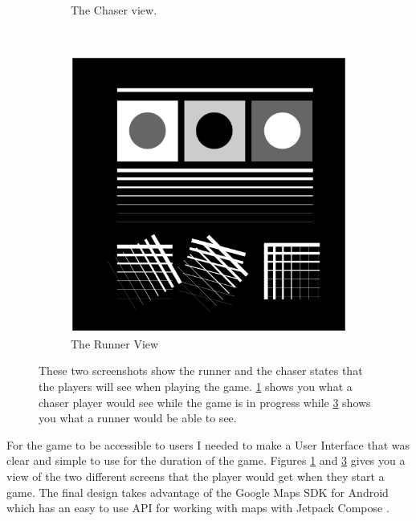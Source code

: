 \documentclass{l4proj}
\begin{document}
\begin{figure}
\begin{subfigure}[b]{0.45\textwidth}
        \caption{The Chaser view.}
        \label{fig:ui_chaser}
    \end{subfigure}
    ~ %
    \begin{subfigure}[b]{0.45\textwidth}
        \includegraphics[width=\textwidth]{images/synthetic_2.png}
        \caption{The Runner View}
        \label{fig:ui_runner}
    \end{subfigure}
    
    \caption{These two screenshots show the runner and the chaser states that the players
    will see when playing the game. \ref{fig:ui_chaser} shows you what a chaser player would
    see while the game is in progress while \ref{fig:ui_runner} shows you what a runner would
    be able to see.
    }
\end{figure}
For the game to be accessible to users I needed to make a User Interface that was
clear and simple to use for the duration of the game. Figures \ref{fig:ui_chaser} and \ref{fig:ui_runner} 
gives you a view of the two different screens that the player would get when they start a
game. The final design takes advantage of the Google Maps SDK for Android which has
an easy to use API for working with maps with Jetpack Compose \citep{GoogleMaps}.
\end{document}

